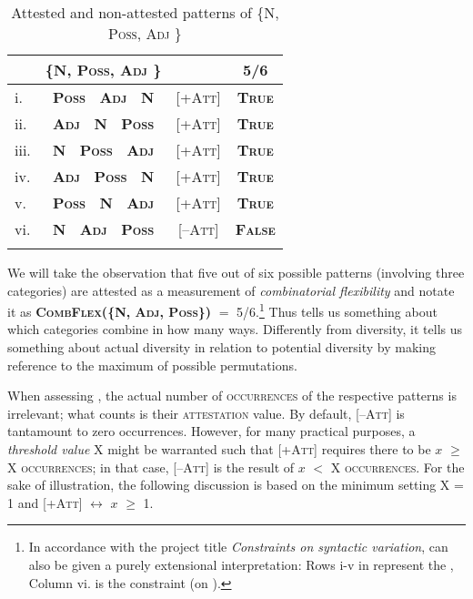 \documentclass[output=paper,colorlinks,citecolor=brown,draft]{langscibook}
\begin{document}
\begin{table}
  \begin{tabularx}{.8\textwidth}{l C  C c}
\lsptoprule
	&  \{\textsc{N, Poss, Adj }\}  & & \textbf{5/6}  \\
\midrule
i. & \textbf{\textsc{ Poss  \ Adj \ N}}   	&	\textsc{[+Att]}	&		\textbf{\textsc{True}} 		\\
ii. & \textbf{\textsc{ Adj \ N \ Poss  }}  &	\textsc{[+Att]}	& \textbf{\textsc{True}} 		\\
iii. & \textbf{\textsc{ N \ Poss  \ Adj }}  &	\textsc{[+Att]}	& \textbf{\textsc{True}} 		\\
iv. & \textbf{\textsc{ Adj \ Poss  \ N }}  &	\textsc{[+Att]}	& \textbf{\textsc{True}} 		\\
v. & \textbf{\textsc{ Poss \ N  \ Adj }}  &	\textsc{[+Att]}	& \textbf{\textsc{True}} 		\\
vi. & \textbf{\textsc{ N \ Adj \ Poss }}  &	\textsc{[--Att]}	&		\textbf{\textsc{False}} 		\\
\lspbottomrule
\end{tabularx}
 \caption{Attested and non-attested patterns of \{\textsc{N, Poss, Adj }\}}
\label{tab:freVaX}
\end{table}


We will take the observation that five out of six possible patterns (involving three categories) are {attested} as a measurement of \textit{combinatorial flexibility} and notate it as \textbf{\textsc{CombFlex({\small\scshape\{N, Adj, Poss\}})}} $=$ 5/6.\footnote{In
  accordance with the project title \textit{Constraints on syntactic variation},    can also be given a purely extensional interpretation: Rows i-v in  represent the ,  Column vi. is the constraint (on ).
} Thus  tells us something about which categories combine in how many ways. Differently from  diversity, it tells us something about actual diversity in relation to potential diversity by making reference to the maximum of possible permutations.

When assessing , the actual number of \textsc{occurrences}  of the respective patterns is irrelevant; what counts is their \textsc{attestation} value.  By default, \textsc{[--Att]}  is tantamount to zero occurrences.   However, for many practical purposes, %
a \textit{threshold value} X might be warranted such that {\textsc{[+Att]} requires there to be $x$ $\geq$  X \textsc{occurrences}; in that case, \textsc{[--Att]} is the result of  $x$ $<$  X \textsc{occurrences}.} For the sake of illustration, the following discussion is based on the minimum setting X = 1 and \textsc{[+Att]} $\leftrightarrow$  $x$ $\ge$ 1.   %
\end{document}
